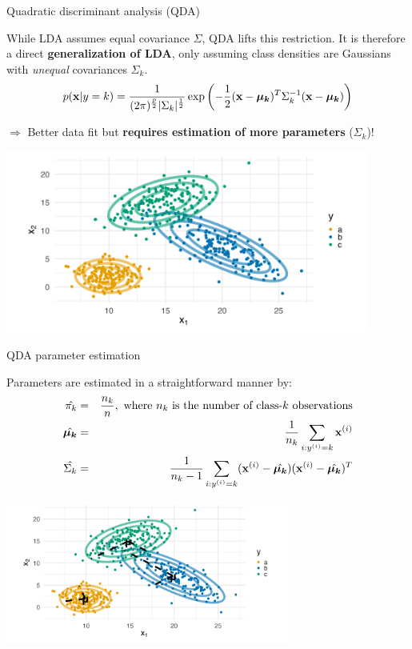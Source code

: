 \documentclass[11pt,compress,t,notes=noshow, xcolor=table]{beamer}
\begin{document}
\begin{vbframe}{Quadratic discriminant analysis (QDA)}

While LDA assumes equal covariance $\Sigma$, QDA lifts this restriction. It is therefore a direct \textbf{generalization of LDA}, only assuming class densities are Gaussians with \textit{unequal} covariances $\Sigma_k$.
$$
p(\mathbf{x} | y= k) = \frac{1}{(2\pi)^{\frac{p}{2}}|\Sigma_k|^{\frac{1}{2}}} \exp\left(-\frac{1}{2}(\mathbf{x} - \bm{\mu_{k}})^T \Sigma_k^{-1} (\mathbf{x} - \bm{\mu_{k}})\right)
$$

$\Rightarrow$ Better data fit but \textbf{requires estimation of more parameters} ($\Sigma_k$)!

\vspace{-0.5em}
\begin{center}
\includegraphics[width=0.9\textwidth, clip=true, trim={0 75 0 45}]{figure/disc_analysis-qda_1.png}
\end{center}

\end{vbframe}

\begin{vbframe}{QDA parameter estimation}

Parameters are estimated in a straightforward manner by:\\
\vspace{-0.9em}
\begin{eqnarray*}
\hat{\pi_{k}} &=& \frac{n_k}{n},\text{ where $n_k$ is the number of class-$k$ observations} \\
\hat{\bm{\mu_{k}}} &=& \frac{1}{n_k}\sum_{i: y^{(i)} = k} \mathbf{x}^{(i)} \\
\hat{\Sigma_k} &=& \frac{1}{n_k - 1} \sum_{i: y^{(i)} = k} (\mathbf{x}^{(i)} - \hat{\bm{\mu_{k}}}) (\mathbf{x}^{(i)} - \hat{\bm{\mu_{k}}})^T \\
\end{eqnarray*}


\vspace{-0.9em}
\begin{center}
\includegraphics[width=0.7\textwidth, clip=true, trim={0 75 0 45}]{figure/disc_analysis-qda_2.png}
\end{center}

\end{vbframe}
\end{document}
